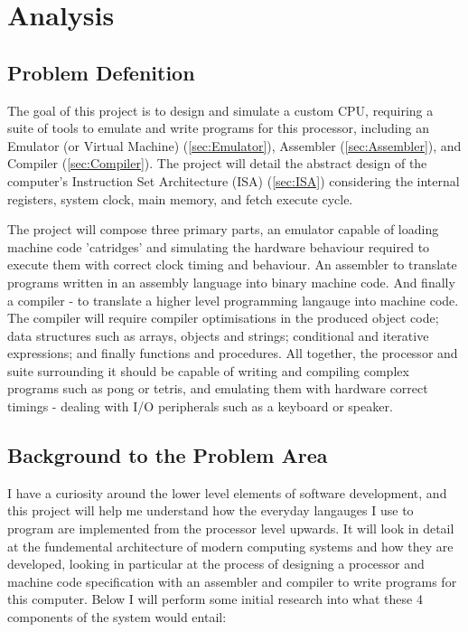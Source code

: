 \section{Analysis}
\subsection{Problem Defenition}
The goal of this project is to design and simulate a custom CPU, requiring a suite of tools to emulate and write programs for this processor, including an Emulator (or Virtual Machine) (\ref{sec:Emulator}), Assembler (\ref{sec:Assembler}), and Compiler (\ref{sec:Compiler}). The project will detail the abstract design of the computer’s Instruction Set Architecture (ISA) (\ref{sec:ISA}) considering the internal registers, system clock, main memory, and fetch execute cycle.

The project will compose three primary parts, an emulator capable of loading machine code 'catridges' and simulating the hardware behaviour required to execute them with correct clock timing and behaviour. An assembler to translate programs written in an assembly language into binary machine code. And finally a compiler - to translate a higher level programming langauge into machine code. The compiler will require compiler optimisations in the produced object code; data structures such as arrays, objects and strings; conditional and iterative expressions; and finally functions and procedures. All together, the processor and suite surrounding it should be capable of writing and compiling complex programs such as pong or tetris, and emulating them with hardware correct timings - dealing with I/O peripherals such as a keyboard or speaker.

\subsection{Background to the Problem Area}
I have a curiosity around the lower level elements of software development, and this project will help me understand how the everyday langauges I use to program are implemented from the processor level upwards. It will look in detail at the fundemental architecture of modern computing systems and how they are developed, looking in particular at the process of designing a processor and machine code specification with an assembler and compiler to write programs for this computer. Below I will perform some initial research into what these 4 components of the system would entail:

